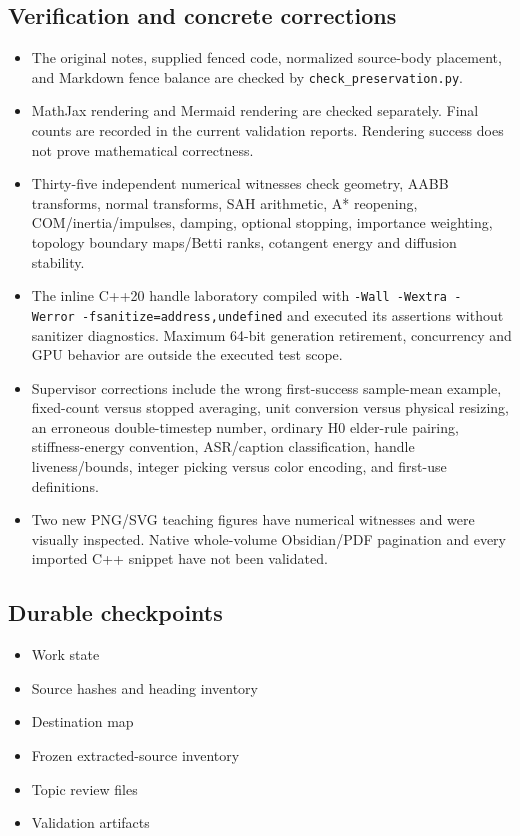 \subsection{Verification and concrete corrections}\label{appendix-3b67654799a2-verification-and-concrete-corrections}

\begin{itemize}
\tightlist
\item
  The original notes, supplied fenced code, normalized source-body placement, and Markdown fence balance are checked by \texttt{check\_preservation.py}.
\item
  MathJax rendering and Mermaid rendering are checked separately. Final counts are recorded in the current validation reports. Rendering success does not prove mathematical correctness.
\item
  Thirty-five independent numerical witnesses check geometry, AABB transforms, normal transforms, SAH arithmetic, A* reopening, COM/inertia/impulses, damping, optional stopping, importance weighting, topology boundary maps/Betti ranks, cotangent energy and diffusion stability.
\item
  The inline C++20 handle laboratory compiled with \texttt{-Wall\ -Wextra\ -Werror\ -fsanitize=address,undefined} and executed its assertions without sanitizer diagnostics. Maximum 64-bit generation retirement, concurrency and GPU behavior are outside the executed test scope.
\item
  Supervisor corrections include the wrong first-success sample-mean example, fixed-count versus stopped averaging, unit conversion versus physical resizing, an erroneous double-timestep number, ordinary H0 elder-rule pairing, stiffness-energy convention, ASR/caption classification, handle liveness/bounds, integer picking versus color encoding, and first-use definitions.
\item
  Two new PNG/SVG teaching figures have numerical witnesses and were visually inspected. Native whole-volume Obsidian/PDF pagination and every imported C++ snippet have not been validated.
\end{itemize}

\subsection{Durable checkpoints}\label{appendix-3b67654799a2-durable-checkpoints}

\begin{itemize}
\tightlist
\item
  {Work state}
\item
  {Source hashes and heading inventory}
\item
  {Destination map}
\item
  {Frozen extracted-source inventory}
\item
  {Topic review files}
\item
  {Validation artifacts}
\end{itemize}

